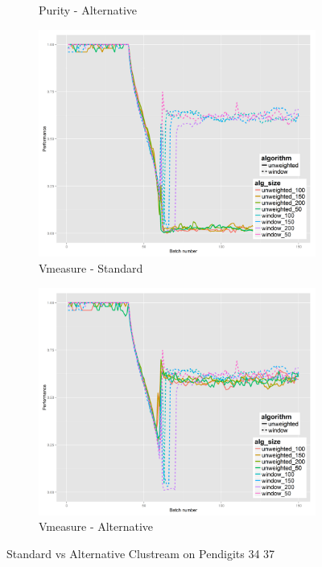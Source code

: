 \begin{figure}[!h]
\begin{subfigure}[b]{0.47\textwidth}
                \caption{Purity - Alternative}
                \label{fig:pa_3437}
        \end{subfigure}
        \begin{subfigure}[b]{0.47\textwidth}
          \includegraphics[width=\textwidth]{standard_alt/ci_evolving_pen_34_37_standard_vmeasure.png}
                 \caption{Vmeasure - Standard}
                 \label{fig:vs_3437}
        \end{subfigure}
        \begin{subfigure}[b]{0.47\textwidth}
                 \includegraphics[width=\textwidth]{standard_alt/ci_evolving_pen_34_37_alternative_vmeasure.png}
                \caption{Vmeasure - Alternative}
                \label{fig:va_3437}
        \end{subfigure}
\caption{Standard vs Alternative Clustream on Pendigits 34 37}
\label{fig:standard_alternative_3437}
\end{figure}

